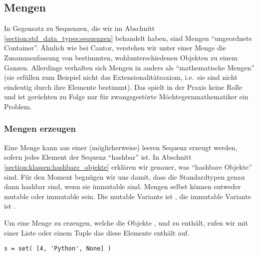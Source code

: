 \subsection{Mengen}
\label{section:std_data_types:mengen}
In Gegensatz zu Sequenzen, die wir im Abschnitt \ref{section:std_data_types:sequenzen} behandelt haben, sind Mengen ``ungeordnete Container''.
Ähnlich wie bei Cantor, verstehen wir unter einer Menge die Zusammenfassung von bestimmten, wohlunterschiedenen Objekten zu einem Ganzen.
Allerdings verhalten sich Mengen in \Python anders als ``mathematische Mengen'' (sie erfüllen zum Beispiel nicht das Extensionalitätsaxiom, i.e.\ sie sind nicht eindeutig durch ihre Elemente bestimmt).
Das spielt in der Praxis keine Rolle und ist gerüchten zu Folge nur für zwangsgestörte Möchtegernmathematiker ein Problem.


\subsubsection{Mengen erzeugen}
\label{section:std_data_types:mengen:mengen_erzeugen}
Eine Menge kann aus einer (möglicherweise) leeren Sequenz erzeugt werden, sofern jedes Element der Sequenz ``hashbar'' ist.
In Abschnitt \ref{section:klassen:hashbare_objekte} erklären wir genauer, was ``hashbare Objekte'' sind.
Für den Moment begnügen wir uns damit, dass die Standardtypen genau dann hashbar sind, wenn sie immutable sind.
Mengen selbst können entweder mutable oder immutable sein.
Die mutable Variante ist , die immutable Variante ist .

Um eine Menge zu erzeugen, welche die Objekte ,  und  zu enthält, rufen wir  mit einer Liste oder einem Tuple das diese Elemente enthält auf.
\begin{lstlisting}
s = set( [4, 'Python', None] )
\end{lstlisting}


